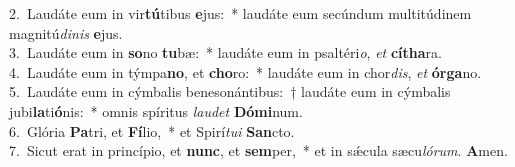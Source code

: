 {2.~}Laudáte eum in vir\textbf{tú}tibus \textbf{e}jus:~* laudáte eum secúndum multitúdinem magnitú\textit{di}\textit{nis} \textbf{e}jus.\\
{3.~}Laudáte eum in \textbf{so}no \textbf{tu}bæ:~* laudáte eum in psaltéri\textit{o}, \textit{et} \textbf{cí}\textbf{tha}ra.\\
{4.~}Laudáte eum in týmpa\textbf{no}, et \textbf{cho}ro:~* laudáte eum in chor\textit{dis}, \textit{et} \textbf{ór}\textbf{ga}no.\\
{5.~}Laudáte eum in cýmbalis benesonántibus:~† laudáte eum in cýmbalis jubi\textbf{la}ti\textbf{ó}nis:~* omnis spíritus \textit{lau}\textit{det} \textbf{Dó}\textbf{mi}num.\\
{6.~}Glória \textbf{Pa}tri, et \textbf{Fí}lio,~* et Spirí\textit{tu}\textit{i} \textbf{San}cto.\\
{7.~}Sicut erat in princípio, et \textbf{nunc}, et \textbf{sem}per,~* et in sǽcula sæcu\textit{ló}\textit{rum}. \textbf{A}men.\\

